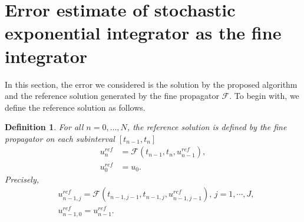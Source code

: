 \documentclass[preprint,12pt]{elsarticle}
\newtheorem{definition}{Definition}
\begin{document}
\section{Error estimate of stochastic exponential integrator as the fine integrator }\label{sec6}
In this section, the error we considered  is the solution by the proposed algorithm and the reference solution generated by the fine propagator $\mathcal{F}$. To begin with, we define the reference solution as follows.
\begin{definition}
	For all $n = 0,\ldots,N$, the reference solution is defined by  the fine propagator on each subinterval $[t_{n-1},t_{n}]$ 
	\begin{align}\label{eq24}
		u_{n}^{ref}&=\mathcal{F}(t_{n-1},t_{n},u_{n-1}^{ref}),\\
		u_{0}^{ref}&=u_{0}.\nonumber
	\end{align}
	Precisely, 
	\begin{align}\label{eq25}
		&u_{n-1,j}^{ref}=\mathcal{F}(t_{n-1,j-1},t_{n-1,j},u_{n-1,j-1}^{ref}), \, j=1,\cdots,J,\\
		&u_{n-1,0}^{ref}=u_{n-1}^{ref}.\nonumber
	\end{align}
\end{definition}
\end{document}
